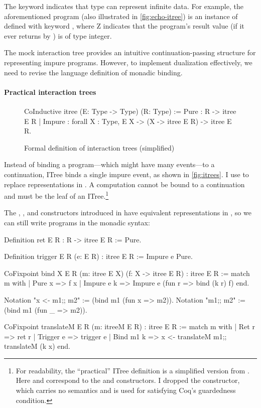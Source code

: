 The  keyword indicates that type  can represent
infinite data.  For example, the aforementioned  program (also
illustrated in \autoref{fig:echo-itree}) is an instance of  defined with keyword , where \ilc Z indicates that the
program's result value (if it ever returns by ) is of type integer.

The mock interaction tree provides an intuitive continuation-passing structure
for representing impure programs.  However, to implement dualization
effectively, we need to revise the language definition of monadic binding.

\paragraph{Practical interaction trees}

\begin{figure}
\begin{coq}
  CoInductive itree (E: Type -> Type) (R: Type) :=
    Pure   : R -> itree E R
  | Impure : forall {X : Type}, E X -> (X -> itree E R) -> itree E R.
\end{coq}
\caption{Formal definition of interaction trees (simplified)}
\label{fig:itrees}
\end{figure}

Instead of binding a program---which might have many events---to a continuation,
ITree binds a single impure event, as shown in \autoref{fig:itrees}.  I
use  to replace  representations
in .  A  computation cannot be bound to a continuation and
must be the leaf of an ITree.\footnote{For readability, the ``practical'' ITree
definition is a simplified version from \citet{itree}.  Here 
and  correspond to the  and  constructors.  I
dropped the  constructor, which carries no
semantics and is used for satisfying Coq's guardedness condition.}

The , , and  constructors introduced in
 have equivalent representations in , so we can still
write programs in the monadic syntax:
\begin{coq}
  Definition ret {E R} : R -> itree E R := Pure.
  
  Definition trigger {E R} (e: E R) : itree E R := Impure e Pure.

  CoFixpoint bind {X E R} (m: itree E X) (f: X -> itree E R) : itree E R :=
    match m with
    | Pure   x   => f x
    | Impure e k => Impure e (fun r => bind (k r) f)
    end.

  Notation "x <- m1;; m2" := (bind m1 (fun x => m2)).
  Notation "m1;; m2"      := (bind m1 (fun _ => m2)).

  CoFixpoint translateM {E R} (m: itreeM E R) : itree E R :=
    match m with
    | Ret     r => ret r
    | Trigger e => trigger e
    | Bind m1 k => x <- translateM m1;; translateM (k x)
    end.
\end{coq}

